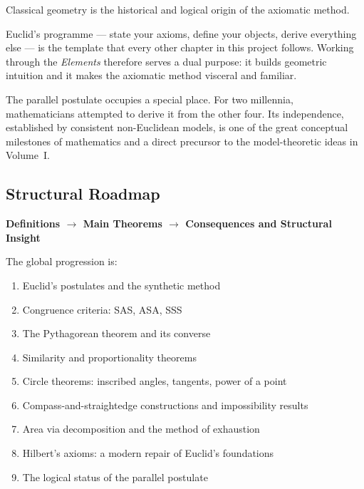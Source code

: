 \begin{tcolorbox}[
  colback=gray!6,
  colframe=gray!40,
  arc=2pt,
  left=8pt, right=8pt, top=6pt, bottom=6pt,
  title={\small\textbf{Structural Role: Classical Geometry — The Axiomatic Template}},
  fonttitle=\small\bfseries
]
Classical geometry is the historical and logical origin of the
axiomatic method.

Euclid's programme --- state your axioms, define your objects,
derive everything else --- is the template that every other
chapter in this project follows.
Working through the \textit{Elements} therefore serves a dual
purpose: it builds geometric intuition and it makes the
axiomatic method visceral and familiar.

The parallel postulate occupies a special place.
For two millennia, mathematicians attempted to derive it from
the other four.
Its independence, established by consistent non-Euclidean
models, is one of the great conceptual milestones of
mathematics and a direct precursor to the model-theoretic
ideas in Volume~I.
\end{tcolorbox}
\vspace{1em}

\subsection*{Structural Roadmap}

\begin{center}
\textbf{Definitions $\longrightarrow$ Main Theorems
$\longrightarrow$ Consequences and Structural Insight}
\end{center}

The global progression is:

\begin{enumerate}
  \item Euclid's postulates and the synthetic method
  \item Congruence criteria: SAS, ASA, SSS
  \item The Pythagorean theorem and its converse
  \item Similarity and proportionality theorems
  \item Circle theorems: inscribed angles, tangents, power of a point
  \item Compass-and-straightedge constructions and impossibility results
  \item Area via decomposition and the method of exhaustion
  \item Hilbert's axioms: a modern repair of Euclid's foundations
  \item The logical status of the parallel postulate
\end{enumerate}

